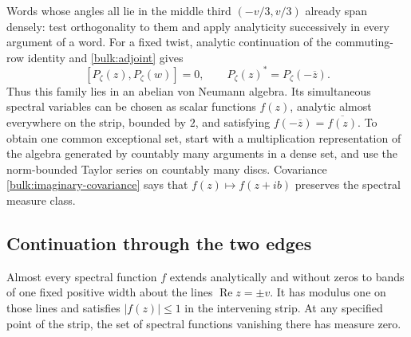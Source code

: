 Words whose angles all lie in the middle third $(-v/3,v/3)$ already
span densely: test orthogonality to them and apply analyticity
successively in every argument of a word. For a fixed twist,
analytic continuation of the commuting-row identity and
\eqref{bulk:adjoint} gives
\begin{equation}\label{bulk:P-star}
 [P_\zeta(z),P_\zeta(w)]=0,\qquad
 P_\zeta(z)^*=P_\zeta(-\overline z).
\end{equation}
Thus this family lies in an abelian von Neumann algebra. Its
simultaneous spectral variables can be chosen as scalar functions
$f(z)$, analytic almost everywhere on the strip, bounded by $2$,
and satisfying $f(-\overline z)=\overline{f(z)}$. To obtain one
common exceptional set, start with a multiplication representation
of the algebra generated by countably many arguments in a dense
set, and use the norm-bounded Taylor series on countably many
discs. Covariance \eqref{bulk:imaginary-covariance} says that
$f(z)\mapsto f(z+ib)$ preserves the spectral measure class.

\subsection{Continuation through the two edges}

\begin{lemma}\label{bulk:edge-band}
Almost every spectral function $f$ extends analytically and
without zeros to bands of one fixed positive width about the
lines $\operatorname{Re}z=\pm v$. It has modulus one on those lines
and satisfies $|f(z)|\le1$ in the intervening strip. At any specified
point of the strip, the set of spectral functions vanishing there
has measure zero.
\end{lemma}


